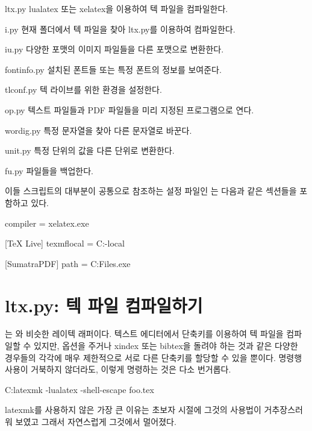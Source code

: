 \begin{macros}[labelwidth=4.75em, leftmargin=5.35em, index=true]
\item[ltx.py] lualatex 또는 xelatex을 이용하여 텍 파일을 컴파일한다.
\item[i.py] 현재 폴더에서 텍 파일을 찾아 ltx.py를 이용하여 컴파일한다.
\item[iu.py] 다양한 포맷의 이미지 파일들을 다른 포맷으로 변환한다.
\item[fontinfo.py] 설치된 폰트들 또는 특정 폰트의 정보를 보여준다.
\item[tlconf.py] 텍 라이브를 위한 환경을 설정한다.
\item[op.py] 텍스트 파일들과 PDF 파일들을 미리 지정된 프로그램으로 연다.
\item[wordig.py] 특정 문자열을 찾아 다른 문자열로 바꾼다.
\item[unit.py] 특정 단위의 값을 다른 단위로 변환한다.
\item[fu.py] 파일들을 백업한다.
\end{macros}

이들 스크립트의 대부분이 공통으로 참조하는 설정 파일인 는 다음과 같은 섹션들을 포함하고 있다.

\begin{codewrite}
[LaTeX]
compiler = xelatex.exe

[TeX Live]
texmflocal = C:\texlive\texmf-local\tex\latex\local

[SumatraPDF]
path = C:\Program Files\SumatraPDF\SumatraPDF.exe
\end{codewrite}
\coderead[language=ini]

\section{ltx.py: 텍 파일 컴파일하기}

는 와 비슷한 레이텍 래퍼이다.
텍스트 에디터에서 단축키를 이용하여 텍 파일을 컴파일할 수 있지만,  옵션을 주거나 xindex 또는 bibtex을 돌려야 하는 것과 같은 다양한 경우들의 각각에 매우 제한적으로 서로 다른 단축키를 할당할 수 있을 뿐이다.
명령행 사용이 거북하지 않더라도, 이렇게 명령하는 것은 다소 번거롭다.

\begin{code}
C:\>latexmk -lualatex -shell-escape foo.tex
\end{code}

latexmk를 사용하지 않은 가장 큰 이유는 초보자 시절에 그것의 사용법이 거추장스러워 보였고 그래서 자연스럽게 그것에서 멀어졌다.

